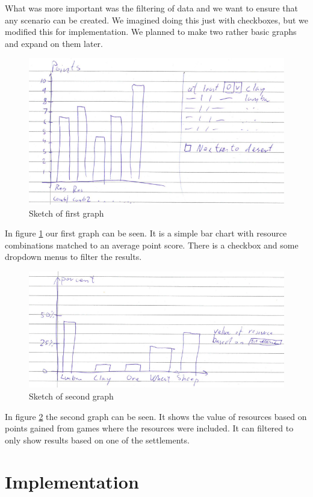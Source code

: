 \documentclass[journal]{vgtc}                %
\begin{document}
What was more important was the filtering of data and we want to ensure that
any scenario can be created. We imagined doing this just with checkboxes, but
we modified this for implementation. We planned to make two rather basic
graphs and expand on them later.
\begin{figure}[!ht]
  \centering
  \includegraphics[width=\linewidth]{sketch1.png}
  \caption{Sketch of first graph}
  \label{fig:sketch1}
\end{figure}
In figure \ref{fig:sketch1} our first graph can be seen. It is a simple bar
chart with resource combinations matched to an average point score. There is a
checkbox and some dropdown menus to filter the results.
\noindent
\begin{figure}[!ht]
  \centering
  \includegraphics[width=\linewidth]{sketch2.png}
  \caption{Sketch of second graph}
  \label{fig:sketch2}
\end{figure}
\noindent
In figure \ref{fig:sketch2} the second graph can be seen. It shows the value
of resources based on points gained from games where the resources were
included. It can filtered to only show results based on one of the
settlements. 

\section{Implementation}
\end{document}
